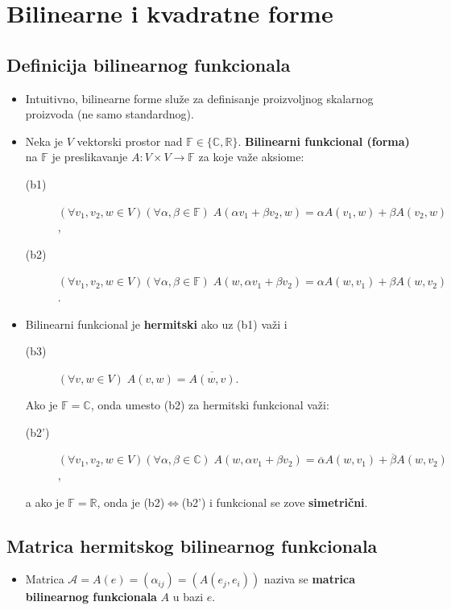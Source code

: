 \documentclass[a4paper,12pt,twoside]{report}
\numberwithin{algorithm}{section}
\begin{document}
\newpage

\section{Bilinearne i kvadratne forme}

\subsection{Definicija bilinearnog funkcionala}
\begin{itemize}
    \item Intuitivno, bilinearne forme služe za definisanje proizvoljnog skalarnog proizvoda (ne samo standardnog).
    \item Neka je $V$ vektorski prostor nad $\mathbb{F} \in \{ \mathbb{C}, \mathbb{R} \}$. \textbf{Bilinearni funkcional (forma)} 
    na $\mathbb{F}$ je preslikavanje $A: V \times V \to \mathbb{F}$ za koje važe aksiome:
    \begin{description}
        \item[(b1)] $(\forall v_1, v_2, w \in V)(\forall \alpha, \beta \in \mathbb{F}) \; A(\alpha v_1 + \beta v_2, w) = \alpha A(v_1, w) + \beta A(v_2, w)$,
        \item[(b2)] $(\forall v_1, v_2, w \in V)(\forall \alpha, \beta \in \mathbb{F}) \; A(w, \alpha v_1 + \beta v_2) = \alpha A(w, v_1) + \beta A(w, v_2)$. 
    \end{description}
    \item Bilinearni funkcional je \textbf{hermitski} ako uz (b1) važi i 
    \begin{description}
        \item[(b3)] $(\forall v, w \in V) \; A(v, w) = \overline{A(w, v)}$.
    \end{description}
    Ako je $\mathbb{F} = \mathbb{C}$, onda umesto (b2) za hermitski funkcional važi:
    \begin{description}
        \item[(b2')] $(\forall v_1, v_2, w \in V)(\forall \alpha, \beta \in \mathbb{C}) \; A(w, \alpha v_1 + \beta v_2) = \overline{\alpha} A(w, v_1) + \overline{\beta} A(w, v_2)$,
    \end{description}
    a ako je $\mathbb{F} = \mathbb{R}$, onda je (b2)$\iff$(b2') i funkcional se zove \textbf{simetrični}.
\end{itemize}

\subsection{Matrica hermitskog bilinearnog funkcionala}
\begin{itemize}
    \item Matrica $\mathcal{A} = A(e) = (\alpha_{ij}) = (A(e_j, e_i))$ naziva se \textbf{matrica bilinearnog funkcionala} $A$ u bazi $e$.
\end{itemize}
\end{document}
